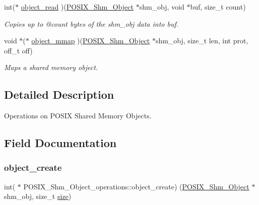 \begin{DoxyCompactItemize}
int($\ast$ \mbox{\hyperlink{structPOSIX__Shm__Object__operations_ae98afda0bb51a6b7502f24203248423b}{object\+\_\+read}} )(\mbox{\hyperlink{structPOSIX__Shm__Object}{P\+O\+S\+I\+X\+\_\+\+Shm\+\_\+\+Object}} $\ast$shm\+\_\+obj, void $\ast$buf, size\+\_\+t count)
\begin{DoxyCompactList}\small\item\em Copies up to @count bytes of the {\itshape shm\+\_\+obj} data into {\itshape buf}. \end{DoxyCompactList}\item 
void $\ast$($\ast$ \mbox{\hyperlink{structPOSIX__Shm__Object__operations_afb54316e0b5da8b4de501949dfd98753}{object\+\_\+mmap}} )(\mbox{\hyperlink{structPOSIX__Shm__Object}{P\+O\+S\+I\+X\+\_\+\+Shm\+\_\+\+Object}} $\ast$shm\+\_\+obj, size\+\_\+t len, int prot, off\+\_\+t off)
\begin{DoxyCompactList}\small\item\em Maps a shared memory object. \end{DoxyCompactList}\end{DoxyCompactItemize}


\subsection{Detailed Description}
Operations on P\+O\+S\+IX Shared Memory Objects. 

\subsection{Field Documentation}
\mbox{\label{structPOSIX__Shm__Object__operations_a79b39f6b71f0d02fe2e6d3a875da6009}} 
\subsubsection{\texorpdfstring{object\_create}{object\_create}}
{\footnotesize\ttfamily int( $\ast$ P\+O\+S\+I\+X\+\_\+\+Shm\+\_\+\+Object\+\_\+operations\+::object\+\_\+create) (\mbox{\hyperlink{structPOSIX__Shm__Object}{P\+O\+S\+I\+X\+\_\+\+Shm\+\_\+\+Object}} $\ast$shm\+\_\+obj, size\+\_\+t \mbox{\hyperlink{sun4u_2tte_8h_a245260f6f74972558f61b85227df5aae}{size}})}



